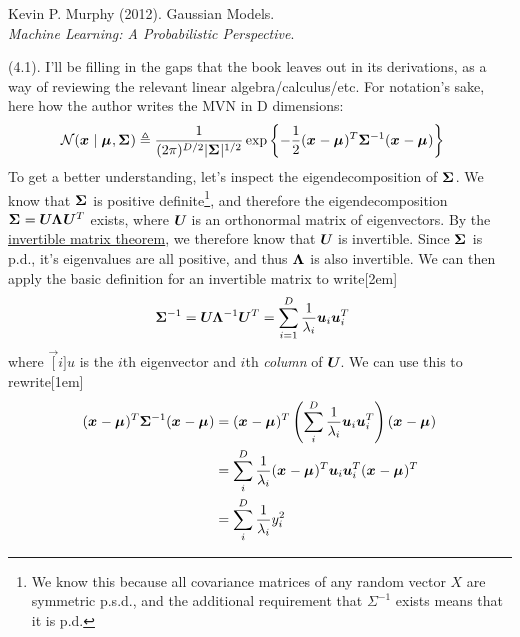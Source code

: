 \documentclass[11pt]{article}
\begin{document}

\vspace{-1.7em}
{\scriptsize Kevin P. Murphy (2012). Gaussian Models.\\ \textit{Machine Learning: A Probabilistic Perspective}.\\ }


\p {} (4.1). I'll be filling in the gaps that the book leaves out in its derivations, as a way of reviewing the relevant linear algebra/calculus/etc. For notation's sake, here how the author writes the MVN in D dimensions:
\begin{align}
	\mathcal{N}(\vec x \mid \vec\mu, \matr\Sigma) 
		&\triangleq \inv{(2\pi)^{D/2} | \matr\Sigma |^{1/2}} \exp\left\{  -\onehalf (\vec x - \vec\mu)^T \matr{\Sigma}^{-1} (\vec x - \vec\mu)   \right\}
\end{align}
To get a better understanding, let's inspect the eigendecomposition of $\matr\Sigma$. We know that $\matr\Sigma$ is positive definite\footnote{We know this because all covariance matrices of any random vector $X$ are symmetric p.s.d., and the additional requirement that $\Sigma^{-1}$ exists means that it is p.d.}, and therefore the eigendecomposition $\matr\Sigma = \matr U \matr\Lambda \matr{U}^T$ exists, where $\matr U$ is an orthonormal matrix of eigenvectors. By the \href{https://www.wikiwand.com/en/Invertible_matrix#/Properties}{invertible matrix theorem}, we therefore know that $\matr U$ is invertible. Since $\matr\Sigma$ is p.d., it's eigenvalues are all positive, and thus $\matr\Lambda$ is also invertible. We can then apply the basic definition for an invertible matrix to write[2em]
\begin{align}
	\minv{\Sigma}
		&= \matr U \minv{\Lambda} \matr{U}^T = \sum_{i=1}^D \inv{\lambda_i} \vec[i]{u} \vec[i]{u}^T
\end{align}
where $\vec[i]{u}$ is the $i$th eigenvector and $i$th \textit{column} of $\matr U$. We can use this to rewrite[1em]
\begin{align}
	(\vec x - \vec\mu)^T \matr{\Sigma}^{-1} (\vec x - \vec\mu)
		&= (\vec x - \vec\mu)^T \left( \sum_i^D \inv{\lambda_i} \vec[i]{u} \vec[i]{u}^T  \right) (\vec x - \vec\mu)\\
		&= \sum_i^D \inv{\lambda_i} (\vec x - \vec\mu)^T  \vec[i]{u} \vec[i]{u}^T (\vec x - \vec\mu)^T \\
		&= \sum_i^D \inv{\lambda_i} y_i^2
\end{align}
\end{document}
